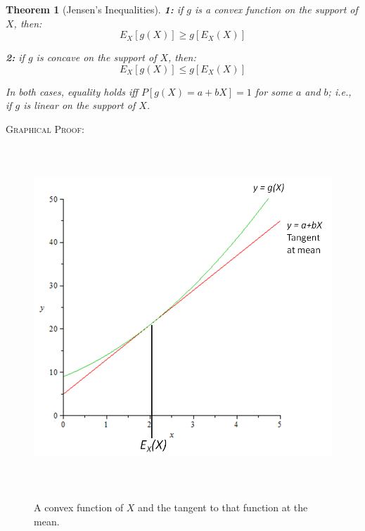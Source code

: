 \documentclass[12pt,a4paper]{article}
\newtheorem{thm}{Theorem}[subsection]
\begin{document}
\begin{thm}[Jensen's Inequalities]\vspace{1cm}

{\bf 1: } if $g$ is a convex function on the support of $X$, then:
$$E_X[g(X)] \geq g[E_X(X)]$$\par\vspace{1cm}

{\bf 2: } if $g$ is concave on the support of $X$, then:
$$E_X[g(X)] \leq g[E_X(X)]$$\par\vspace{1cm}

In both cases, equality holds iff $P[g(X) = a+bX] = 1$ for some $a$ and $b$; i.e., if $g$ is linear on the support of $X$.

\end{thm}

\noindent\textsc{Graphical Proof:}\par\vspace{1cm}

\begin{figure}[h]
\begin{center}
\includegraphics[height=12.86cm,width=13.8cm]{M2S1 Jensen's Inequalities.png}\label{jensen}
\caption{A convex function of $X$ and the tangent to that function at the mean.}
\end{center}
\end{figure}
\end{document}
